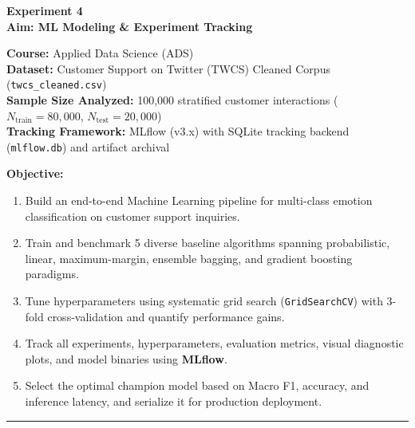 \documentclass[11pt, a4paper]{article}
\begin{document}
\begin{center}
    {\LARGE \textbf{Experiment 4}} \\[0.3em]
    {\large \textbf{Aim: ML Modeling \& Experiment Tracking}}
\end{center}

\vspace{0.3em}
\noindent \textbf{Course:} Applied Data Science (ADS) \\
\noindent \textbf{Dataset:} Customer Support on Twitter (TWCS) Cleaned Corpus (\texttt{twcs\_cleaned.csv}) \\
\noindent \textbf{Sample Size Analyzed:} 100,000 stratified customer interactions ($N_{\text{train}} = 80,000$, $N_{\text{test}} = 20,000$) \\
\noindent \textbf{Tracking Framework:} MLflow (v3.x) with SQLite tracking backend (\texttt{mlflow.db}) and artifact archival

\vspace{0.5em}
\noindent \textbf{Objective:}
\begin{enumerate}[leftmargin=1.5em]
    \item Build an end-to-end Machine Learning pipeline for multi-class emotion classification on customer support inquiries.
    \item Train and benchmark 5 diverse baseline algorithms spanning probabilistic, linear, maximum-margin, ensemble bagging, and gradient boosting paradigms.
    \item Tune hyperparameters using systematic grid search (\texttt{GridSearchCV}) with 3-fold cross-validation and quantify performance gains.
    \item Track all experiments, hyperparameters, evaluation metrics, visual diagnostic plots, and model binaries using \textbf{MLflow}.
    \item Select the optimal champion model based on Macro F1, accuracy, and inference latency, and serialize it for production deployment.
\end{enumerate}

\vspace{0.4em}
\hrule
\vspace{0.6em}

\end{document}
